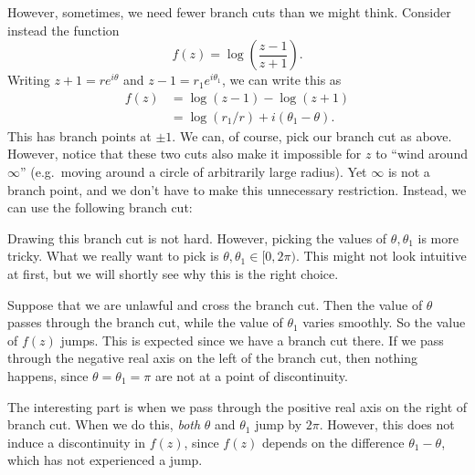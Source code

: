 \documentclass[a4paper]{article}
\begin{document}
However, sometimes, we need fewer branch cuts than we might think. Consider instead the function
\[
  f(z) = \log\left(\frac{z - 1}{z + 1}\right).
\]
Writing $z + 1 = r e^{i\theta}$ and $z - 1 = r_1 e^{i \theta_1}$, we can write this as
\begin{align*}
  f(z) &= \log (z - 1) - \log(z + 1)\\
  &= \log(r_1/r) + i(\theta_1 - \theta).
\end{align*}
This has branch points at $\pm 1$. We can, of course, pick our branch cut as above. However, notice that these two cuts also make it impossible for $z$ to ``wind around $\infty$'' (e.g.\ moving around a circle of arbitrarily large radius). Yet $\infty$ is not a branch point, and we don't have to make this unnecessary restriction. Instead, we can use the following branch cut:
\begin{center}
\end{center}
Drawing this branch cut is not hard. However, picking the values of $\theta, \theta_1$ is more tricky. What we really want to pick is $\theta, \theta_1 \in [0, 2\pi)$. This might not look intuitive at first, but we will shortly see why this is the right choice.

Suppose that we are unlawful and cross the branch cut. Then the value of $\theta$ passes through the branch cut, while the value of $\theta_1$ varies smoothly. So the value of $f(z)$ jumps. This is expected since we have a branch cut there. If we pass through the negative real axis on the left of the branch cut, then nothing happens, since $\theta = \theta_1 = \pi$ are not at a point of discontinuity.

The interesting part is when we pass through the positive real axis on the right of branch cut. When we do this, \emph{both} $\theta$ and $\theta_1$ jump by $2\pi$. However, this does not induce a discontinuity in $f(z)$, since $f(z)$ depends on the difference $\theta_1 - \theta$, which has not experienced a jump.
\end{document}
